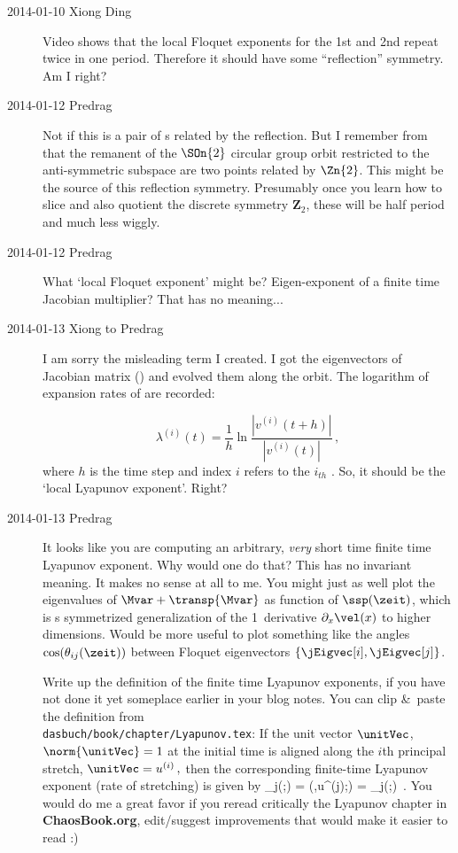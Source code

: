 \begin{description}

\item[2014-01-10 Xiong Ding]
{Video} 
shows
that the local Floquet exponents for the 1st and 2nd {\cLvs}
repeat twice in one period. Therefore it should have some ``reflection''
symmetry. Am I right?

\item[2014-01-12 Predrag] Not if this is a pair of \po s related by
the reflection.
But I remember from  that the remanent of the $\SOn{2}$
circular group orbit restricted to the anti-symmetric subspace are two
points related by $\Zn{2}$. This might be the source of this reflection
symmetry. Presumably once you learn how
to slice and also quotient the discrete symmetry $\mathbf{Z}_2$, these will
be half period and much less wiggly.

\item[2014-01-12 Predrag]  What `local Floquet exponent' might be?
Eigen-exponent of a finite time Jacobian multiplier? That has no
meaning...

\item[2014-01-13 Xiong to Predrag] I am sorry the misleading term I created.
 I got the eigenvectors of Jacobian
matrix ({\cLvs}) and evolved them along the orbit. The logarithm of
expansion rates of {\cLvs} are recorded:

\begin{equation}
  \label{eq:locallyapunov}
  \lambda^{(i)}(t)=\frac{1}{h}\ln \frac{|v^{(i)}(t+h)|}{|v^{(i)}(t)|}
\,,
\end{equation}
where $h$ is the time step and index $i$ refers to the $i_{th}$ {\cLv}.
So, it should be the `local Lyapunov exponent'. Right?

\item[2014-01-13 Predrag] It looks like you are computing an arbitrary,
\emph{very} short time finite time Lyapunov exponent. Why would one do
that? This has no invariant meaning. It makes no sense at all to me. You
might just as well plot the eigenvalues of $\Mvar + \transp{\Mvar}$ as
function of $\ssp(\zeit)$, which is s symmetrized generalization of the
1\dmn\ derivative $\partial_x \vel(x)$ to higher dimensions. Would be
more useful to plot something like the angles $\cos(\theta_{ij}(\zeit))$
between Floquet eigenvectors $\{\jEigvec[i], \jEigvec[j]\}$.

Write up the definition of the finite time Lyapunov exponents, if you
have not done it yet someplace earlier in your blog notes. You can clip
\&\ paste the definition from
\\
\texttt{dasbuch/book/chapter/Lyapunov.tex}:
If the
unit vector $\unitVec$, $\norm{\unitVec} =1$ at the initial time
is aligned along the $i$th {principal stretch},
\(
\unitVec = {u}^{(i)}
\,,
\)
then the corresponding finite-time
Lyapunov exponent (rate of stretching) is given by
\beq
\Lyap_j(\xInit;\zeit) =
    \Lyap(\xInit,{u}^{(j)};\zeit)
    = \ln\sigma_j(\xInit;\zeit)
\,.
You would do me a great favor if you reread critically the Lyapunov
chapter in \textbf{ChaosBook.org}, edit/suggest improvements that would
make it easier to read :)


\end{description}
